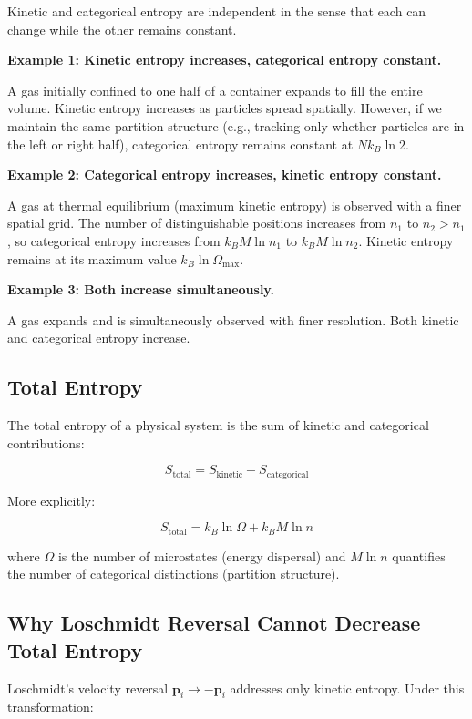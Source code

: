 \documentclass[twocolumn,10pt]{article}
\theoremstyle{definition}
\theoremstyle{remark}
\begin{document}
Kinetic and categorical entropy are independent in the sense that each can change while the other remains constant.

\textbf{Example 1: Kinetic entropy increases, categorical entropy constant.}

A gas initially confined to one half of a container expands to fill the entire volume. Kinetic entropy increases as particles spread spatially. However, if we maintain the same partition structure (e.g., tracking only whether particles are in the left or right half), categorical entropy remains constant at $N k_B \ln 2$.

\textbf{Example 2: Categorical entropy increases, kinetic entropy constant.}

A gas at thermal equilibrium (maximum kinetic entropy) is observed with a finer spatial grid. The number of distinguishable positions increases from $n_1$ to $n_2 > n_1$, so categorical entropy increases from $k_B M \ln n_1$ to $k_B M \ln n_2$. Kinetic entropy remains at its maximum value $k_B \ln \Omega_{\text{max}}$.

\textbf{Example 3: Both increase simultaneously.}

A gas expands and is simultaneously observed with finer resolution. Both kinetic and categorical entropy increase.

\subsection{Total Entropy}

The total entropy of a physical system is the sum of kinetic and categorical contributions:

$$
S_{\text{total}} = S_{\text{kinetic}} + S_{\text{categorical}}
$$

More explicitly:

$$
S_{\text{total}} = k_B \ln \Omega + k_B M \ln n
$$

where $\Omega$ is the number of microstates (energy dispersal) and $M \ln n$ quantifies the number of categorical distinctions (partition structure).

\subsection{Why Loschmidt Reversal Cannot Decrease Total Entropy}

Loschmidt's velocity reversal $\mathbf{p}_i \to -\mathbf{p}_i$ addresses only kinetic entropy. Under this transformation:
\end{document}
